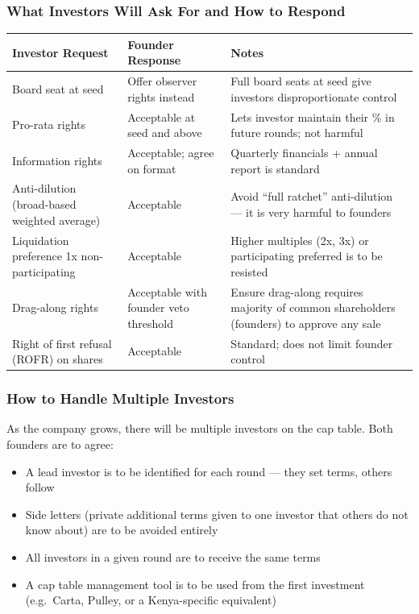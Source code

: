 \documentclass[12pt,a4paper]{article}
\begin{document}
\subsubsection{What Investors Will Ask For and How to Respond}

\begin{tabularx}{\linewidth}{L{4cm} L{4cm} X}
  \toprule
  \textbf{Investor Request} & \textbf{Founder Response} & \textbf{Notes} \\
  \midrule
  Board seat at seed       & Offer observer rights instead & Full board seats at seed give investors disproportionate control \\[0.4em]
  Pro-rata rights          & Acceptable at seed and above  & Lets investor maintain their \% in future rounds; not harmful \\[0.4em]
  Information rights       & Acceptable; agree on format   & Quarterly financials + annual report is standard \\[0.4em]
  Anti-dilution (broad-based weighted average) & Acceptable & Avoid ``full ratchet'' anti-dilution --- it is very harmful to founders \\[0.4em]
  Liquidation preference 1x non-participating & Acceptable & Higher multiples (2x, 3x) or participating preferred is to be resisted \\[0.4em]
  Drag-along rights        & Acceptable with founder veto threshold & Ensure drag-along requires majority of common shareholders (founders) to approve any sale \\[0.4em]
  Right of first refusal (ROFR) on shares & Acceptable & Standard; does not limit founder control \\
  \bottomrule
\end{tabularx}

\subsubsection{How to Handle Multiple Investors}

As the company grows, there will be multiple investors on the cap table. Both founders are to agree:

\begin{itemize}
  \item A lead investor is to be identified for each round --- they set terms, others follow
  \item Side letters (private additional terms given to one investor that others do not know about) are to be avoided entirely
  \item All investors in a given round are to receive the same terms
  \item A cap table management tool is to be used from the first investment (e.g.\ Carta, Pulley, or a Kenya-specific equivalent)
\end{itemize}
\end{document}
